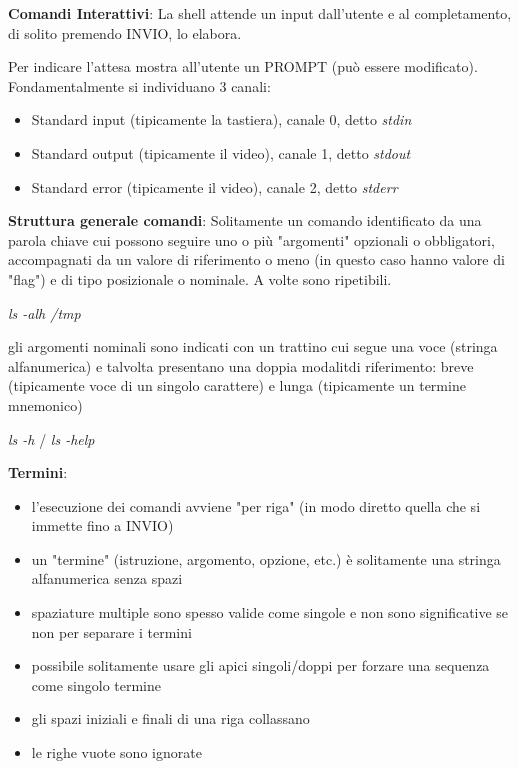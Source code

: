 \begin{flushleft}
  \textbf{Comandi Interattivi}: La shell attende un input dall'utente e al completamento, di solito premendo INVIO, lo elabora. \par 
  Per indicare l’attesa mostra all’utente un PROMPT (può essere modificato). \\
  Fondamentalmente si individuano 3 canali:
  \begin{itemize}
    \item Standard input (tipicamente la tastiera), canale 0, detto \textit{stdin}
    \item Standard output (tipicamente il video), canale 1, detto \textit{stdout}
    \item Standard error (tipicamente il video), canale 2, detto \textit{stderr}
  \end{itemize}
\end{flushleft}
\begin{flushleft}
  \textbf{Struttura generale comandi}: Solitamente un comando \ace identificato da una parola chiave cui possono seguire uno o 
    più "argomenti" opzionali o obbligatori, accompagnati da un valore di riferimento o 
    meno (in questo caso hanno valore di "flag") e di tipo posizionale o nominale. A volte 
    sono ripetibili. \par
    \begin{center}
      \textit{ls -alh /tmp} 
    \end{center}
    gli argomenti nominali sono indicati con un trattino cui segue una voce (stringa 
    alfanumerica) e talvolta presentano una doppia modalit\aca di riferimento: breve 
    (tipicamente voce di un singolo carattere) e lunga (tipicamente un termine mnemonico)
    \begin{flushleft}
      \textit{ls -h} / \textit{ls -help}
    \end{flushleft}
\end{flushleft}
\begin{flushleft}
  \textbf{Termini}:
  \begin{itemize}
    \item l'esecuzione dei comandi avviene "per riga" (in modo diretto quella che si immette fino a INVIO)
    \item un "termine" (istruzione, argomento, opzione, etc.) è solitamente una stringa alfanumerica senza spazi
    \item spaziature multiple sono spesso valide come singole e non sono significative se non per separare i termini 
    \item \ace possibile solitamente usare gli apici singoli/doppi per forzare una sequenza come singolo termine
    \item gli spazi iniziali e finali di una riga collassano 
    \item le righe vuote sono ignorate
  \end{itemize}
\end{flushleft}
